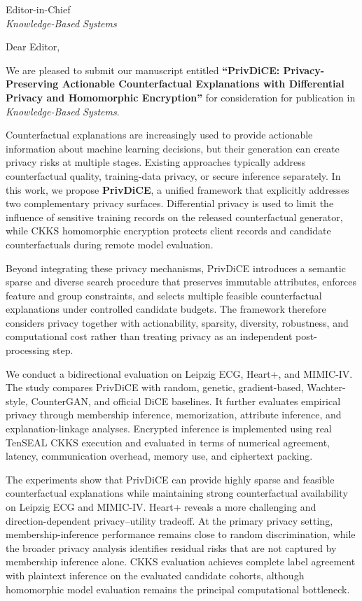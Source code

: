 \documentclass[11pt]{letter}
\begin{document}
\begin{letter}{
Editor-in-Chief\\
\textit{Knowledge-Based Systems}
}

\opening{Dear Editor,}

We are pleased to submit our manuscript entitled
\textbf{``PrivDiCE: Privacy-Preserving Actionable Counterfactual Explanations
with Differential Privacy and Homomorphic Encryption''}
for consideration for publication in \textit{Knowledge-Based Systems}.

Counterfactual explanations are increasingly used to provide actionable
information about machine learning decisions, but their generation can create
privacy risks at multiple stages. Existing approaches typically address
counterfactual quality, training-data privacy, or secure inference separately.
In this work, we propose \textbf{PrivDiCE}, a unified framework that explicitly
addresses two complementary privacy surfaces. Differential privacy is used to
limit the influence of sensitive training records on the released
counterfactual generator, while CKKS homomorphic encryption protects client
records and candidate counterfactuals during remote model evaluation.

Beyond integrating these privacy mechanisms, PrivDiCE introduces a semantic
sparse and diverse search procedure that preserves immutable attributes,
enforces feature and group constraints, and selects multiple feasible
counterfactual explanations under controlled candidate budgets. The framework
therefore considers privacy together with actionability, sparsity, diversity,
robustness, and computational cost rather than treating privacy as an
independent post-processing step.

We conduct a bidirectional evaluation on Leipzig ECG, Heart+, and MIMIC-IV.
The study compares PrivDiCE with random, genetic, gradient-based, Wachter-style,
CounterGAN, and official DiCE baselines. It further evaluates empirical privacy
through membership inference, memorization, attribute inference, and
explanation-linkage analyses. Encrypted inference is implemented using real
TenSEAL CKKS execution and evaluated in terms of numerical agreement,
latency, communication overhead, memory use, and ciphertext packing.

The experiments show that PrivDiCE can provide highly sparse and feasible
counterfactual explanations while maintaining strong counterfactual
availability on Leipzig ECG and MIMIC-IV. Heart+ reveals a more challenging
and direction-dependent privacy--utility tradeoff. At the primary privacy
setting, membership-inference performance remains close to random
discrimination, while the broader privacy analysis identifies residual risks
that are not captured by membership inference alone. CKKS evaluation achieves
complete label agreement with plaintext inference on the evaluated candidate
cohorts, although homomorphic model evaluation remains the principal
computational bottleneck.


\end{letter}
\end{document}
